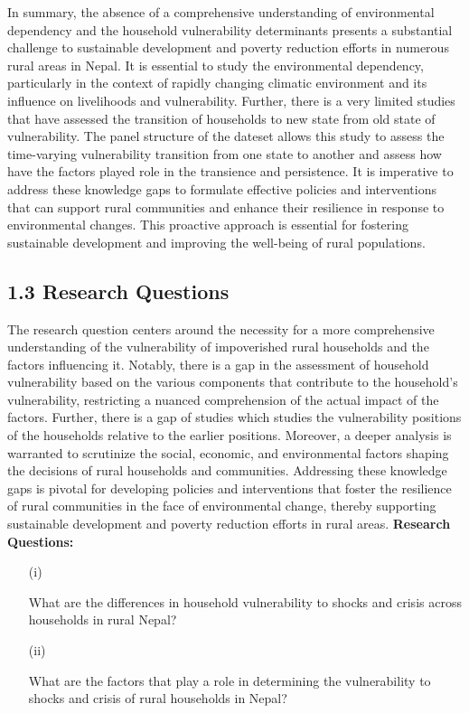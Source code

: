 \documentclass[12pt, a4paper]{article}
\begin{document}
In summary, the absence of a comprehensive understanding of environmental dependency and the household vulnerability determinants presents a substantial challenge to sustainable development and poverty reduction efforts in numerous rural areas in Nepal. It is essential to study the environmental dependency, particularly in the context of rapidly changing climatic environment and its influence on livelihoods and vulnerability. Further, there is a very limited studies that have assessed the transition of households to new state from old state of vulnerability. The panel structure of the dateset allows this study to assess the time-varying vulnerability transition from one state to another and assess how have the factors played role in the transience and persistence. It is imperative to address these knowledge gaps to formulate effective policies and interventions that can support rural communities and enhance their resilience in response to environmental changes. This proactive approach is essential for fostering sustainable development and improving the well-being of rural populations.

\subsection*{1.3 Research Questions}
\renewcommand{\thepage}{\arabic{page}}
The research question centers around the necessity for a more comprehensive understanding of the vulnerability of impoverished rural households and the factors influencing it. Notably, there is a gap in the assessment of household vulnerability based on the various components that contribute to the household's vulnerability, restricting a nuanced comprehension of the actual impact of the factors. Further, there is a gap of studies which studies the vulnerability positions of the households relative to the earlier positions. Moreover, a deeper analysis is warranted to scrutinize the social, economic, and environmental factors shaping the decisions of rural households and communities. Addressing these knowledge gaps is pivotal for developing policies and interventions that foster the resilience of rural communities in the face of environmental change, thereby supporting sustainable development and poverty reduction efforts in rural areas.
\vspace{1cm}
\newline
\textbf{Research Questions:} 
\begin{enumerate}
	\item[(i)] \parbox[t]{\linewidth}{What are the differences in household vulnerability to shocks and crisis across households in rural Nepal?}
	\item [(ii)] \parbox[t]{\linewidth}{What are the factors that play a role in determining the vulnerability to shocks and crisis of rural households in Nepal?}
\end{enumerate}
\end{document}
